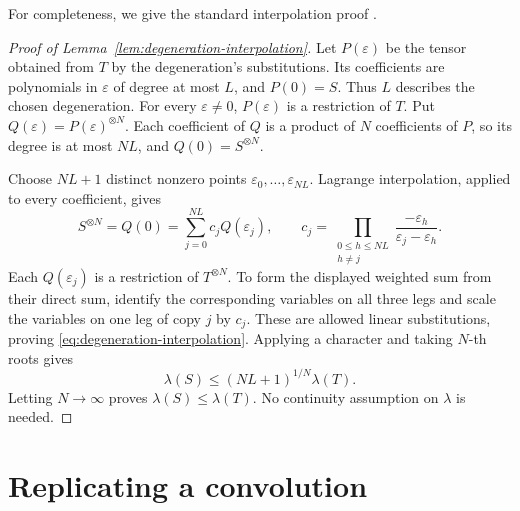 \documentclass[11pt]{article}
\begin{document}
For completeness, we give the standard interpolation proof
\cite[Theorem~8]{christandl-jensen-zuiddam-2018-nonmultiplicativity}.

\begin{proof}[Proof of Lemma~\ref{lem:degeneration-interpolation}]
Let $P(\varepsilon)$ be the tensor obtained from $T$ by the degeneration's
substitutions. Its coefficients are polynomials in $\varepsilon$ of degree
at most $L$, and $P(0)=S$. Thus $L$ describes the chosen degeneration.
For every $\varepsilon\ne0$, $P(\varepsilon)$ is a restriction of $T$.
Put $Q(\varepsilon)=P(\varepsilon)^{\otimes N}$. Each coefficient of $Q$
is a product of $N$ coefficients of $P$, so its degree is at most $NL$,
and $Q(0)=S^{\otimes N}$.

Choose $NL+1$ distinct nonzero points $\varepsilon_0,\ldots,\varepsilon_{NL}$.
Lagrange interpolation, applied to every coefficient, gives
\[
 S^{\otimes N}=Q(0)=\sum_{j=0}^{NL}c_jQ(\varepsilon_j),\qquad
 c_j=\prod_{\substack{0\le h\le NL\\h\ne j}}
 \frac{-\varepsilon_h}{\varepsilon_j-\varepsilon_h}.
\]
Each $Q(\varepsilon_j)$ is a restriction of $T^{\otimes N}$.
To form the displayed weighted sum from their direct sum, identify the
corresponding variables on all three legs and scale the variables on
one leg of copy $j$ by $c_j$. These are allowed linear substitutions,
proving \eqref{eq:degeneration-interpolation}. Applying a character and
taking $N$-th roots gives
\[
 \lambda(S)\le(NL+1)^{1/N}\lambda(T).
\]
Letting $N\to\infty$ proves $\lambda(S)\le\lambda(T)$.
No continuity assumption on $\lambda$ is needed.
\end{proof}

\section{Replicating a convolution}\label{app:replication}
\end{document}
